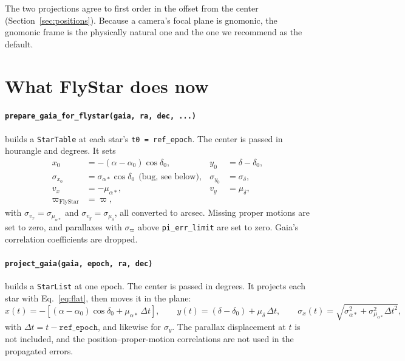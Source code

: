 \documentclass[11pt]{article}
\newcommand{\code}[1]{\texttt{#1}}
\begin{document}
The two projections agree to first order in the offset from the center
(Section~\ref{sec:positions}). Because a camera's focal plane is gnomonic, the
gnomonic frame is the physically natural one and the one we recommend as the
default.

\section{What FlyStar does now}
\label{sec:now}

\paragraph{\code{prepare\_gaia\_for\_flystar(gaia, ra, dec, ...)}} builds a
\code{StarTable} at each star's \code{t0 = ref\_epoch}. The center is passed
in hourangle and degrees. It sets
\begin{align}
  x_0 &= -(\alpha-\alpha_0)\cos\delta_0, & y_0 &= \delta-\delta_0, \\
  \sigma_{x_0} &= \sigma_{\alpha*}\cos\delta_0 \ \ \text{(bug, see below)}, & \sigma_{y_0} &= \sigma_\delta, \\
  v_x &= -\mu_{\alpha*}, & v_y &= \mu_\delta, \\
  \varpi_\mathrm{FlyStar} &= \varpi, & &
\end{align}
with $\sigma_{v_x} = \sigma_{\mu_{\alpha*}}$ and $\sigma_{v_y} = \sigma_{\mu_\delta}$, all
converted to arcsec. Missing proper motions are set to zero, and parallaxes with
$\sigma_\varpi$ above \code{pi\_err\_limit} are set to zero. Gaia's
correlation coefficients are dropped.

\paragraph{\code{project\_gaia(gaia, epoch, ra, dec)}} builds a
\code{StarList} at one epoch. The center is passed in degrees. It projects
each star with Eq.~\eqref{eq:flat}, then moves it in the plane:
\begin{equation}
  x(t) = -\left[(\alpha-\alpha_0)\cos\delta_0 + \mu_{\alpha*}\,\Delta t\right], \qquad
  y(t) = (\delta-\delta_0) + \mu_\delta\,\Delta t, \qquad
  \sigma_x(t) = \sqrt{\sigma_{\alpha*}^2 + \sigma_{\mu_{\alpha*}}^2\Delta t^2},
\end{equation}
with $\Delta t = t - \mathtt{ref\_epoch}$, and likewise for $\sigma_y$. The
parallax displacement at $t$ is not included, and the position--proper-motion
correlations are not used in the propagated errors.
\end{document}
